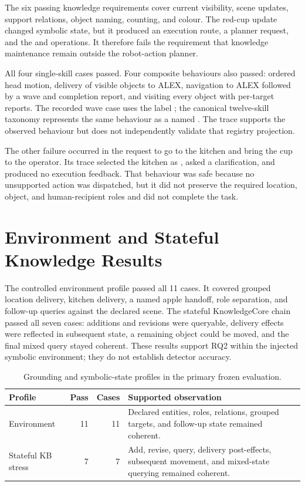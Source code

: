The six passing knowledge requirements cover current visibility, scene updates, support relations, object naming, counting, and colour. The red-cup update changed symbolic state, but it produced an execution route, a planner request, and the  and  operations. It therefore fails the requirement that knowledge maintenance remain outside the robot-action planner.

All four single-skill cases passed. Four composite behaviours also passed: ordered head motion, delivery of visible objects to ALEX, navigation to ALEX followed by a wave and completion report, and visiting every object with per-target reports. The recorded wave case uses the label ; the canonical twelve-skill taxonomy represents the same behaviour as a named . The trace supports the observed behaviour but does not independently validate that registry projection.

The other failure occurred in the request to go to the kitchen and bring the cup to the operator. Its trace selected the kitchen as , asked a clarification, and produced no execution feedback. That behaviour was safe because no unsupported action was dispatched, but it did not preserve the required location, object, and human-recipient roles and did not complete the task.

\section{Environment and Stateful Knowledge Results}

The controlled environment profile passed all 11 cases. It covered grouped location delivery, kitchen delivery, a named apple handoff, role separation, and follow-up queries against the declared scene. The stateful KnowledgeCore chain passed all seven cases: additions and revisions were queryable, delivery effects were reflected in subsequent state, a remaining object could be moved, and the final mixed query stayed coherent. These results support RQ2 within the injected symbolic environment; they do not establish detector accuracy.

\begin{table}[H]
\centering
\small
\renewcommand{\arraystretch}{1.12}
\caption{Grounding and symbolic-state profiles in the primary frozen evaluation.}
\label{tab:grounding-kb-results}
\begin{tabularx}{\textwidth}{@{}p{}rrX@{}}
\toprule
\textbf{Profile} & \textbf{Pass} & \textbf{Cases} & \textbf{Supported observation}\\
\midrule
Environment & 11 & 11 & Declared entities, roles, relations, grouped targets, and follow-up state remained coherent.\\
Stateful KB stress & 7 & 7 & Add, revise, query, delivery post-effects, subsequent movement, and mixed-state querying remained coherent.\\
\bottomrule
\end{tabularx}
\end{table}

